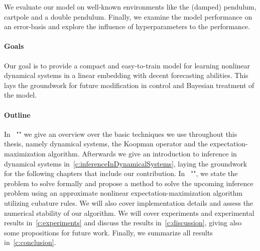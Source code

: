 	We evaluate our model on well-known environments like the (damped) pendulum, cartpole and a double pendulum. Finally, we examine the model performance on an error-basis and explore the influence of hyperparameters to the performance.

\paragraph{Goals}
	Our goal is to provide a compact and easy-to-train model for learning nonlinear dynamical systems in a linear embedding with decent forecasting abilities. This lays the groundwork for future modification in control and Bayesian treatment of the model.

\paragraph{Outline}
	In \chapterautorefname~"" we give an overview over the basic techniques we use throughout this thesis, namely dynamical systems, the Koopman operator and the expectation-maximization algorithm. Afterwards we give an introduction to inference in dynamical systems in~\autoref{c:inferenceInDynamicalSystems}, laying the groundwork for the following chapters that include our contribution. In \chapterautorefname~"", we state the problem to solve formally and propose a method to solve the upcoming inference problem using an approximate nonlinear expectation-maximization algorithm utilizing cubature rules. We will also cover implementation details and assess the numerical stability of our algorithm. We will cover experiments and experimental results in~\autoref{c:experiments} and discuss the results in~\autoref{c:discussion}, giving also some propositions for future work. Finally, we summarize all results in~\autoref{c:conclusion}.
